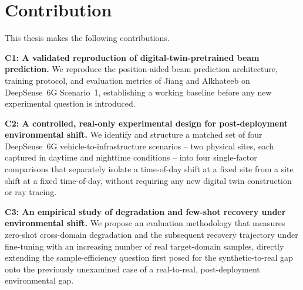 \documentclass{iutbscthesis}
\begin{document}
\section{Contribution}

This thesis makes the following contributions.

\textbf{C1: A validated reproduction of digital-twin-pretrained beam prediction.} We reproduce the position-aided beam prediction architecture, training protocol, and evaluation metrics of Jiang and Alkhateeb \cite{jiang2023digitaltwinbeam} on DeepSense~6G Scenario~1, establishing a working baseline before any new experimental question is introduced.

\textbf{C2: A controlled, real-only experimental design for post-deployment environmental shift.} We identify and structure a matched set of four DeepSense~6G vehicle-to-infrastructure scenarios -- two physical sites, each captured in daytime and nighttime conditions -- into four single-factor comparisons that separately isolate a time-of-day shift at a fixed site from a site shift at a fixed time-of-day, without requiring any new digital twin construction or ray tracing.

\textbf{C3: An empirical study of degradation and few-shot recovery under environmental shift.} We propose an evaluation methodology that measures zero-shot cross-domain degradation and the subsequent recovery trajectory under fine-tuning with an increasing number of real target-domain samples, directly extending the sample-efficiency question first posed for the synthetic-to-real gap onto the previously unexamined case of a real-to-real, post-deployment environmental gap.
\end{document}
